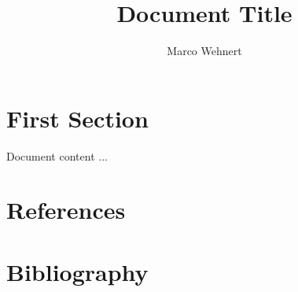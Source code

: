\documentclass{stddoc}
\author{Marco Wehnert}
\title{Document Title}
\begin{document}
\maketitle

\tableofcontents

\section{First Section}

Document content ...




\section{References}

\cite{ISO15765-2}

\section{Bibliography}



\end{document}
